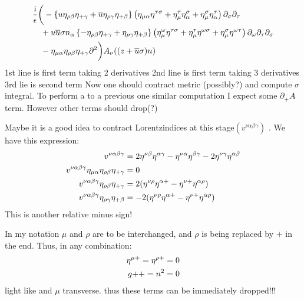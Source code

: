 \begin{align}
&\frac{\text{i}}{\epsilon}\bigg( - \left\{ u  \eta_{\rho\beta} \eta_{+\gamma} +\overline u  \eta_{\rho \gamma}\eta_{+\beta} \right\}\left(\eta_{\mu\alpha}\eta^{\tau \sigma} + \eta_\mu^{\tau} \eta_\alpha^{ \sigma} +\eta_\mu^{ \sigma}\eta_\alpha^{ \tau}\right)\partial_{\sigma}\partial_{\tau} 
\\&~~~
+u\overline u\sigma n_\alpha\left\{ -   \eta_{\rho\beta} \eta_{+\gamma} + \eta_{\rho \gamma}\eta_{+\beta} \right\}\left(\eta_\mu^{\omega}\eta^{\tau \sigma} + \eta_\mu^{ \tau} \eta^{\omega \sigma} +\eta_\mu^{ \sigma}\eta^{\omega \tau}\right) \partial_\omega\partial_\tau\partial_\sigma
\\&~~~
- \eta_{\mu \alpha} \eta_{\rho \beta}\eta_{+\gamma}\partial^2 \bigg)A_{\nu}((z+\overline u \sigma) n)
\end{align}
1st line is first term taking 2 derivatives
2nd line is first term taking 3 derivatives
3rd lie is second term
Now one should contract metric (possibly?) and compute $\sigma$ integral. To perform a to a previous one similar computation I expect some $\partial_+ A$ term. However other terms should drop(?)


Maybe it is a good idea to contract Lorentzindices at this stage$(v^{\nu\alpha\beta\gamma})$ . We have this expression: 
\begin{align}
v^{\nu\alpha\beta\gamma} 
&=
2\eta^{\nu \beta}\eta^{\alpha\gamma}-\eta^{\nu \alpha}\eta^{\beta \gamma} -2\eta^{\nu \gamma} \eta^{\alpha\beta}
\\
v^{\nu\alpha\beta\gamma}\eta_{\mu\alpha}\eta_{\rho\beta}\eta_{+\gamma}
&=
0
\\
v^{\nu\alpha\beta\gamma}\eta_{\rho\beta}\eta_{+\gamma}
&=
2(\eta^{\nu \rho} \eta^{\alpha+} - \eta^{\nu +}\eta^{\alpha\rho})
\\
v^{\nu\alpha\beta\gamma}\eta_{\rho\gamma}\eta_{+\beta}
&=
-2(\eta^{\nu \rho} \eta^{\alpha+} - \eta^{\nu +}\eta^{\alpha\rho})
\end{align}
This is another relative minus sign!

In my notation $\mu $ and $\rho$ are to be interchanged, and $\rho$ is being replaced by $+$ in the end. Thus, in any combination: 
\begin{align}
\eta^{\mu +} = \eta^{\rho +} = 0
\\
g{++}=n^2=0
\end{align}
light like and $\mu$ transverse. thus these terms can be immediately dropped!!!


